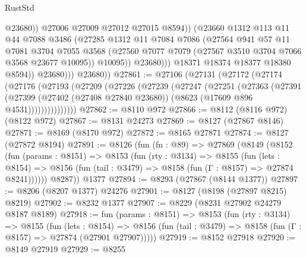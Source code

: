 \begin{lexlean}{RustStd}
\begin{coremodule}
                              @23680))
                          @27006
                          @27009
                          @27012
                          @27015
                          @8594))
                      (@23660
                        @1312
                        @113
                        @11
                        @44
                        @7088
                        @3486
                        (@27285
                          @1312
                          @11
                          @7084
                          @7086
                          (@27564
                            @941
                            @57
                            @11
                            @7081
                            @3704
                            @7055
                            @3568
                            (@27560 @7077 @7079 (@27567 @3510 @3704 @7066 @3568 @23677 @10095))
                            @10095))
                        @23680)))
                  @18371
                  @18374
                  @18377
                  @18380
                  @8594))
              @23680)))
        @23680))
@27861 := @27106
    (@27131
      (@27172
        (@27174
          (@27176
            (@27193
              (@27209
                (@27226
                  (@27239
                    (@27247
                      (@27251
                        (@27363
                          (@27391
                            (@27399
                              (@27402 (@27408 @27840 @23680))
                              (@8623 (@17609 @896 @4531)))))))))))))))
@27862 := @8110 @972
@27866 := @8112 (@8116 @972) (@8122 @972)
@27867 := @8131 @24273
@27869 := @8127 (@27867 @8146)
@27871 := @8169 (@8170 @972)
@27872 := @8165 @27871
@27874 := @8127 (@27872 @8194)
@27891 := @8126
    (fun (fn : @89) =>
    @27869
      (@8149
        (@8152
          (fun (params : @8151) =>
          @8153
            (fun (rty : @3134) =>
            @8155
              (fun (lets : @8154) =>
              @8156 (fun (tail : @3479) => @8158 (fun (Γ : @8157) => @27874 @8241))))))
        @8287))
    @1377
@27894 := @8293 (@27867 (@8144 @1377))
@27897 := @8206 (@8207 @1377) @24276
@27901 := @8127 (@8198 (@27897 @8215) @8219)
@27902 := @8232 @1377
@27907 := @8229 (@8231 @27902 @24279 @8187 @8189)
@27918 := fun (params : @8151) =>
  @8153
    (fun (rty : @3134) =>
    @8155
      (fun (lets : @8154) =>
      @8156 (fun (tail : @3479) => @8158 (fun (Γ : @8157) => @27874 (@27901 @27907)))))
@27919 := @8152 @27918
@27920 := @8149 @27919
@27929 := @8255

\end{coremodule}
\end{lexlean}

